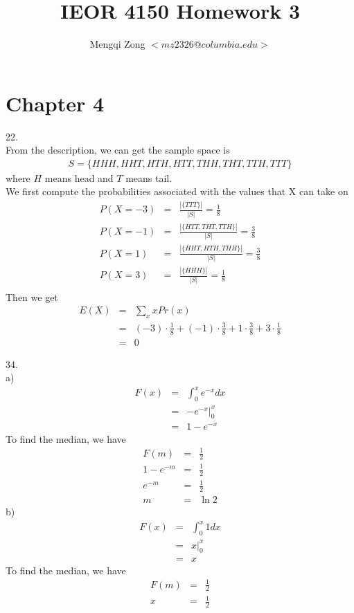 \documentclass[12pt]{article}
\title{IEOR 4150 Homework 3}
\author{Mengqi Zong $<mz2326@columbia.edu>$}
\begin{document}
\maketitle

\setlength{\parindent}{0in}

\section*{Chapter 4}

22. \\
From the description, we can get the sample space is
\begin{eqnarray*}
  S = \{ HHH, HHT, HTH, HTT, THH, THT, TTH, TTT\}
\end{eqnarray*}
where $H$ means head and $T$ means tail. \\

We first compute the probabilities associated with the values that X can take on
\begin{eqnarray*}
  P(X = -3) &=& \frac {|\{ TTT \}|}{|S|} = \frac {1}{8} \\
  P(X = -1) &=& \frac {|\{ HTT, THT, TTH \}|}{|S|} = \frac {3}{8} \\
  P(X =  1) &=& \frac {|\{ HHT, HTH, THH \}|}{|S|} = \frac {3}{8} \\
  P(X =  3) &=& \frac {|\{ HHH \}|}{|S|} = \frac {1}{8} \\
\end{eqnarray*}
Then we get
\begin{eqnarray*}
  E(X) &=& \sum_x x Pr(x) \\
       &=& (-3) \cdot \frac {1}{8} + (-1) \cdot \frac {3}{8}
           + 1 \cdot \frac {3}{8} + 3 \cdot \frac {1}{8} \\
       &=& 0
\end{eqnarray*}

34. \\
a)
\begin{eqnarray*}
  F(x) &=& \int_0^x e^{-x} dx \\
       &=& -e^{-x}|_0^x \\
       &=& 1 - e^{-x}
\end{eqnarray*}
To find the median, we have
\begin{eqnarray*}
  F(m) &=& \frac {1}{2} \\
  1 - e^{-m} &=& \frac {1}{2} \\ 
  e^{-m} &=& \frac {1}{2} \\
  m &=& \ln 2
\end{eqnarray*}
b)
\begin{eqnarray*}
  F(x) &=& \int_0^x 1 dx \\
       &=& x|_0^x \\
       &=& x
\end{eqnarray*}
To find the median, we have
\begin{eqnarray*}
  F(m) &=& \frac {1}{2} \\
  x &=& \frac {1}{2} \\ 
\end{eqnarray*}
\end{document}
